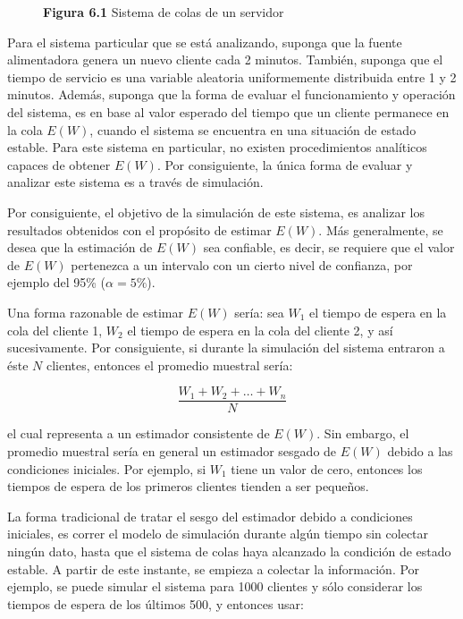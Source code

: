 \documentclass[11pt,letterpaper]{report}
\begin{document}
\begin{figure}[H]
\centering
\caption*{\textbf{Figura 6.1} Sistema de colas de un servidor}
\end{figure}

Para el sistema particular que se está analizando, suponga que la
fuente alimentadora genera un nuevo cliente cada 2 minutos. También,
suponga que el tiempo de servicio es una variable aleatoria
uniformemente distribuida entre 1 y 2 minutos. Además, suponga que la
forma de evaluar el funcionamiento y operación del sistema, es en base
al valor esperado del tiempo que un cliente permanece en la cola
$E(W)$, cuando el sistema se encuentra en una situación de estado
estable. Para este sistema en particular, no existen procedimientos
analíticos capaces de obtener $E(W)$. Por consiguiente, la única forma
de evaluar y analizar este sistema es a través de simulación.

Por consiguiente, el objetivo de la simulación de este sistema, es
analizar los resultados obtenidos con el propósito de estimar $E(W)$.
Más generalmente, se desea que la estimación de $E(W)$ sea confiable, es
decir, se requiere que el valor de $E(W)$ pertenezca a un intervalo con
un cierto nivel de confianza, por ejemplo del 95\% ($\alpha=5\%$).

Una forma razonable de estimar $E(W)$ sería: sea $W_1$ el tiempo de
espera en la cola del cliente 1, $W_2$ el tiempo de espera en la cola
del cliente 2, y así sucesivamente. Por consiguiente, si durante la
simulación del sistema entraron a éste $N$ clientes, entonces el
promedio muestral sería:

\begin{equation}
\frac{W_1 + W_2 + \ldots + W_n}{N}
\end{equation}

el cual representa a un estimador consistente de $E(W)$. Sin embargo, el
promedio muestral sería en general un estimador sesgado de $E(W)$ debido
a las condiciones iniciales. Por ejemplo, si $W_1$ tiene un valor de
cero, entonces los tiempos de espera de los primeros clientes tienden a
ser pequeños.

La forma tradicional de tratar el sesgo del estimador debido a
condiciones iniciales, es correr el modelo de simulación durante algún
tiempo sin colectar ningún dato, hasta que el sistema de colas haya
alcanzado la condición de estado estable. A partir de este instante, se
empieza a colectar la información. Por ejemplo, se puede simular el
sistema para 1000 clientes y sólo considerar los tiempos de espera de
los últimos 500, y entonces usar:
\end{document}
